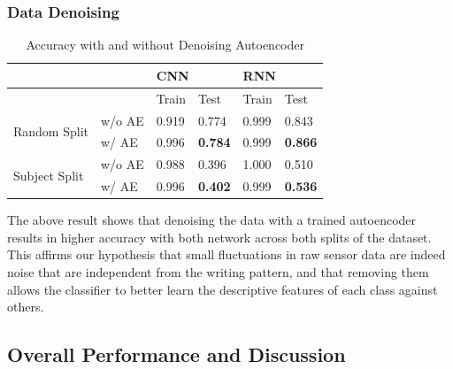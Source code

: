 \documentclass{article}
\begin{document}
\begin{multicols*}{2}
\subsubsection{Data Denoising}
\begin{table}[H]
\centering
\begin{tabular}{llllll}
                               &        & \multicolumn{2}{l}{CNN} & \multicolumn{2}{l}{RNN} \\ \hline
                               &        & Train      & Test       & Train      & Test       \\ \hline
\multirow{2}{*}{Random Split}  & w/o AE & 0.919      & 0.774      & 0.999      & 0.843      \\  
                               & w/ AE  & 0.996      & \textbf{0.784}      & 0.999      & \textbf{0.866}      \\ \hline
\multirow{2}{*}{Subject Split} & w/o AE & 0.988      & 0.396      & 1.000      & 0.510      \\  
                               & w/ AE  & 0.996      & \textbf{0.402}      & 0.999      & \textbf{0.536}      \\ \hline
\end{tabular}
\vspace{3pt}
\caption{Accuracy with and without Denoising Autoencoder}
\label{tab:denoise-ae-acc}
\end{table}

\vspace{-15px}

The above result shows that denoising the data with a trained autoencoder results in higher accuracy with both network across both splits of the dataset. This affirms our hypothesis that small fluctuations in raw sensor data are indeed noise that are independent from the writing pattern, and that removing them allows the classifier to better learn the descriptive features of each class against others.

\subsection{Overall Performance and Discussion}


\end{multicols*}
\end{document}
